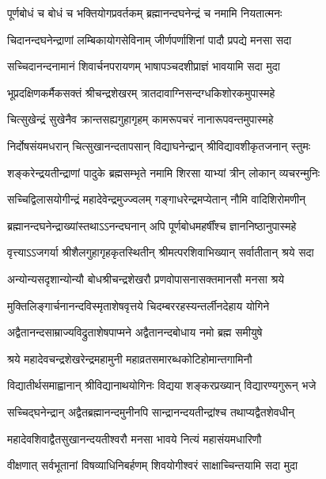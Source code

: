 \twolineshloka
{पूर्णबोधं च बोधं च भक्तियोगप्रवर्तकम्}
{ब्रह्मानन्दघनेन्द्रं च नमामि नियतात्मनः}%

\twolineshloka
{चिदानन्दघनेन्द्राणां लम्बिकायोगसेविनाम्}
{जीर्णपर्णाशिनां पादौ प्रपद्ये मनसा सदा}%

\twolineshloka
{सच्चिदानन्दनामानं शिवार्चनपरायणम्}
{भाषापञ्चदशीप्राज्ञं भावयामि सदा मुदा}%

\twolineshloka
{भूप्रदक्षिणकर्मैकसक्तं श्रीचन्द्रशेखरम्}
{त्रातदावाग्निसन्दग्धकिशोरकमुपास्महे}%

\twolineshloka
{चित्सुखेन्द्रं सुखेनैव क्रान्तसह्यगुहागृहम्}
{कामरूपचरं नानारूपवन्तमुपास्महे}%

\twolineshloka
{निर्दोषसंयमधरान् चित्सुखानन्दतापसान्}
{विद्याघनेन्द्रान् श्रीविद्यावशीकृतजनान् स्तुमः}

\twolineshloka
{शङ्करेन्द्रयतीन्द्राणां पादुके ब्रह्मसम्भृते}
{नमामि शिरसा याभ्यां त्रीन् लोकान् व्यचरन्मुनिः}%

\twolineshloka
{सच्चिद्विलासयोगीन्द्रं महादेवेन्द्रमुज्ज्वलम्}
{गङ्गाधरेन्द्रमप्येतान् नौमि वादिशिरोमणीन्}

\twolineshloka
{ब्रह्मानन्दघनेन्द्राख्यांस्तथाऽऽनन्दघनान् अपि}
{पूर्णबोधमहर्षींश्च ज्ञाननिष्ठानुपास्महे} %

\twolineshloka
{वृत्त्याऽऽजगर्या श्रीशैलगुहागृहकृतस्थितीन्}
{श्रीमत्परशिवाभिख्यान् सर्वातीतान् श्रये सदा}%

\twolineshloka
{अन्योन्यसदृशान्योन्यौ बोधश्रीचन्द्रशेखरौ}
{प्रणवोपासनासक्तमानसौ मनसा श्रये}%

\twolineshloka
{मुक्तिलिङ्गार्चनानन्दविस्मृताशेषवृत्तये}
{चिदम्बररहस्यन्तर्लीनदेहाय योगिने}%

\twolineshloka
{अद्वैतानन्दसाम्राज्यविद्रुताशेषपाप्मने}
{अद्वैतानन्दबोधाय नमो ब्रह्म समीयुषे}%

\twolineshloka
{श्रये महादेवचन्द्रशेखरेन्द्रमहामुनी}
{महाव्रतसमारब्धकोटिहोमान्तगामिनौ}%

\twolineshloka
{विद्यातीर्थसमाह्वानान् श्रीविद्यानाथयोगिनः}
{विद्यया शङ्करप्रख्यान् विद्यारण्यगुरून् भजे}%

\twolineshloka
{सच्चिद्घनेन्द्रान् अद्वैतब्रह्मानन्दमुनीनपि}
{सान्द्रानन्दयतीन्द्रांश्च तथाप्यद्वैतशेवधीन्}%

\twolineshloka
{महादेवशिवाद्वैतसुखानन्दयतीश्वरौ}
{मनसा भावये नित्यं महासंयमधारिणौ}%

\twolineshloka
{वीक्षणात् सर्वभूतानां विषव्याधिनिबर्हणम्}
{शिवयोगीश्वरं साक्षाच्चिन्तयामि सदा मुदा}%

